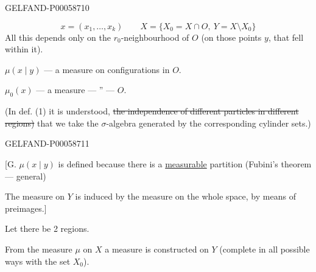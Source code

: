 \begin{GelfandAdjacentEvidence}{GELFAND-P000587}{10}

\[
x=(x_1,\ldots,x_k)
\qquad
X=\{X_0=X\cap O,\ Y=X\setminus X_0\}
\]
All this depends only on the \(r_0\)-neighbourhood of \(O\) (on those points \(y\), that fell within it).

\(\mu(x\mid y)\) — a measure on configurations in \(O\).

\(\mu_0(x)\) — a measure \quad — \textquotedblright{} — \quad \(O\).

(In def. (1) it is understood,
\sout{the independence of different particles in different regions)}
that we take the \(\sigma\)-algebra generated by the corresponding cylinder sets.)
\end{GelfandAdjacentEvidence}
\begin{GelfandAdjacentEvidence}{GELFAND-P000587}{11}


[G. \(\mu(x\mid y)\) is defined because there is a \underline{measurable} partition (Fubini's theorem — general)

The measure on \(Y\) is induced by the measure on the whole space, by means of preimages.]

Let there be 2 regions.
\end{GelfandAdjacentEvidence}

From the measure \(\mu\) on \(X\) a measure is constructed on \(Y\)
(complete in all possible ways with the set \(X_0\)).


